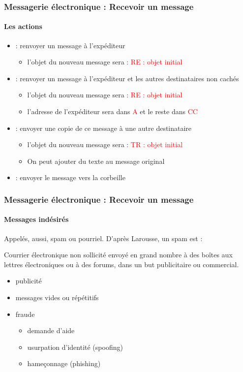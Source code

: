 \documentclass[xcolor=table]{beamer}
\begin{document}
\begin{frame}
\frametitle{Messagerie électronique : Recevoir un message}
\framesubtitle{Les actions}

\begin{itemize}
	\item {} : renvoyer un message à l'expéditeur
	\begin{itemize}
		\item l'objet du nouveau message sera : \textcolor{red}{RE : objet initial}
	\end{itemize}
	\item {} : renvoyer un message à l'expéditeur et les autres destinataires non cachés
	\begin{itemize}
		\item l'objet du nouveau message sera : \textcolor{red}{RE : objet initial}
		\item l'adresse de l'expéditeur sera dans \textcolor{red}{A} et le reste dans \textcolor{red}{CC}
	\end{itemize}
	
	\item {} : envoyer une copie de ce message à une autre destinataire  
	\begin{itemize}
		\item l'objet du nouveau message sera : \textcolor{red}{TR : objet initial}
		\item On peut ajouter du texte au message original
	\end{itemize}
	
	\item {} : envoyer le message vers la corbeille 
	
\end{itemize}


\end{frame}

\begin{frame}
\frametitle{Messagerie électronique : Recevoir un message}
\framesubtitle{Messages indésirés}

Appelés, aussi, spam ou pourriel. D'après Larousse, un spam est :
\begin{definition}
	Courrier électronique non sollicité envoyé en grand nombre à des boîtes aux lettres électroniques ou à des forums, dans un but publicitaire ou commercial.
\end{definition}

\begin{itemize}
	\item publicité
	\item messages vides ou répétitifs
	\item fraude
	\begin{itemize}
		\item demande d'aide
		\item usurpation d'identité (spoofing)
		\item hameçonnage (phishing)
	\end{itemize}
\end{itemize}

\end{frame}
\end{document}
